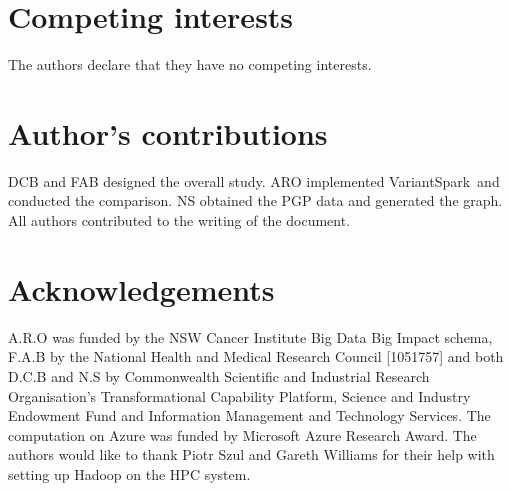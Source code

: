 \documentclass{bmcart}
\newcommand{\variantSpark}{{\sc VariantSpark}}
\begin{document}
\begin{backmatter}

\section*{Competing interests}
  The authors declare that they have no competing interests.

\section*{Author's contributions}
    DCB and FAB designed the overall study. ARO implemented \variantSpark\ and conducted the comparison. NS obtained the PGP data and generated the graph.
    All authors contributed to the writing of the document. 

\section*{Acknowledgements}
  A.R.O was funded by the NSW Cancer Institute Big Data Big Impact schema, F.A.B by the National Health and Medical Research Council [1051757] and both D.C.B and N.S by Commonwealth Scientific and Industrial Research Organisation's Transformational Capability Platform, Science and Industry Endowment Fund and Information Management and Technology Services. The computation on Azure was funded by Microsoft Azure Research Award. 
The authors would like to thank Piotr Szul and Gareth Williams for their help with setting up Hadoop on the HPC system.




\end{backmatter}
\end{document}
